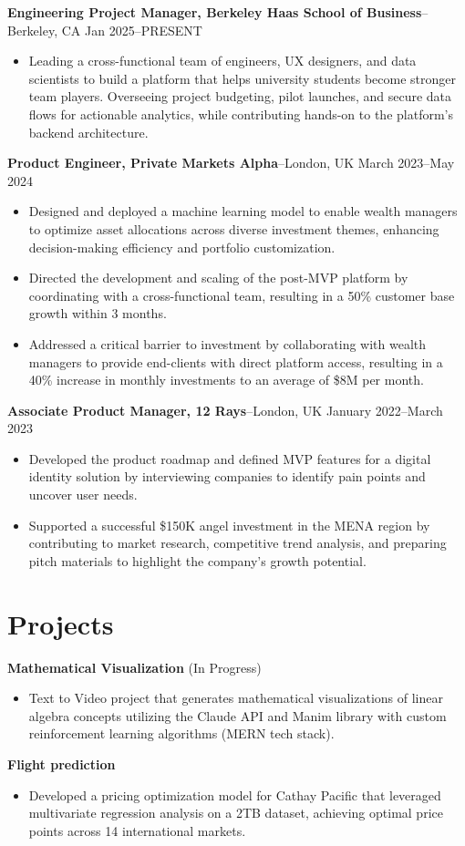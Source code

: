 \documentclass{article}
\begin{document}
\textbf{Engineering Project Manager, Berkeley Haas School of Business}--Berkeley, CA \hfill Jan 2025--PRESENT
\begin{itemize}[leftmargin=*,noitemsep]
    \item Leading a cross-functional team of engineers, UX designers, and data scientists to build a platform that helps university students become stronger team players. Overseeing project budgeting, pilot launches, and secure data flows for actionable analytics, while contributing hands-on to the platform's backend architecture.
\end{itemize}

\textbf{Product Engineer, Private Markets Alpha}--London, UK \hfill March 2023--May 2024
\begin{itemize}[leftmargin=*,noitemsep]
    \item Designed and deployed a machine learning model to enable wealth managers to optimize asset allocations across diverse investment themes, enhancing decision-making efficiency and portfolio customization.
    \item Directed the development and scaling of the post-MVP platform by coordinating with a cross-functional team, resulting in a 50\% customer base growth within 3 months.
    \item Addressed a critical barrier to investment by collaborating with wealth managers to provide end-clients with direct platform access, resulting in a 40\% increase in monthly investments to an average of \$8M per month.
\end{itemize}

\textbf{Associate Product Manager, 12 Rays}--London, UK \hfill January 2022--March 2023
\begin{itemize}[leftmargin=*,noitemsep]
    \item Developed the product roadmap and defined MVP features for a digital identity solution by interviewing companies to identify pain points and uncover user needs.
    \item Supported a successful \$150K angel investment in the MENA region by contributing to market research, competitive trend analysis, and preparing pitch materials to highlight the company's growth potential.
\end{itemize}

\section*{Projects}
\textbf{Mathematical Visualization} (In Progress)
\begin{itemize}[leftmargin=*,noitemsep]
    \item Text to Video project that generates mathematical visualizations of linear algebra concepts utilizing the Claude API and Manim library with custom reinforcement learning algorithms (MERN tech stack).
\end{itemize}

\textbf{Flight prediction}
\begin{itemize}[leftmargin=*,noitemsep]
    \item Developed a pricing optimization model for Cathay Pacific that leveraged multivariate regression analysis on a 2TB dataset, achieving optimal price points across 14 international markets.
\end{itemize}
\end{document}

